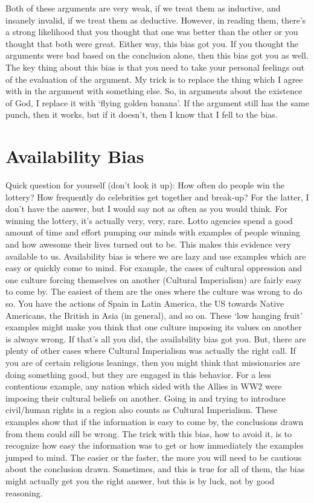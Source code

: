 Both of these arguments are very weak, if we treat them as inductive, and insanely invalid, if we treat them as deductive. However, in reading them, there's a strong likelihood that you thought that one was better than the other or you thought that both were great. Either way, this bias got you. If you thought the arguments were bad based on the conclusion alone, then this bias got you as well. The key thing about this bias is that you need to take your personal feelings out of the evaluation of the argument. My trick is to replace the thing which I agree with in the argument with something else. So, in arguments about the existence of God, I replace it with `flying golden banana'. If the argument still has the same punch, then it works, but if it doesn't, then I know that I fell to the bias.
\section{Availability Bias}

Quick question for yourself (don't look it up): How often do people win the lottery? How frequently do celebrities get together and break-up? For the latter, I don't have the answer, but I would say not as often as you would think. For winning the lottery, it's actually very, very, rare. Lotto agencies spend a good amount of time and effort pumping our minds with examples of people winning and how awesome their lives turned out to be. This makes this evidence very available to us. Availability bias is where we are lazy and use examples which are easy or quickly come to mind. For example, the cases of cultural oppression and one culture forcing themselves on another (Cultural Imperialism) are fairly easy to come by. The easiest of them are the ones where the culture was wrong to do so. You have the actions of Spain in Latin America, the US towards Native Americans, the British in Asia (in general), and so on. These `low hanging fruit' examples might make you think that one culture imposing its values on another is always wrong. If that's all you did, the availability bias got you. But, there are plenty of other cases where Cultural Imperialism was actually the right call. If you are of certain religious leanings, then you might think that missionaries are doing something good, but they are engaged in this behavior. For a less contentious example, any nation which sided with the Allies in WW2 were imposing their cultural beliefs on another. Going in and trying to introduce civil/human rights in a region also counts as Cultural Imperialism. These examples show that if the information is easy to come by, the conclusions drawn from them could sill be wrong. The trick with this bias, how to avoid it, is to recognize how easy the information was to get or how immediately the examples jumped to mind. The easier or the faster, the more you will need to be cautious about the conclusion drawn. Sometimes, and this is true for all of them, the bias might actually get you the right answer, but this is by luck, not by good reasoning. 


